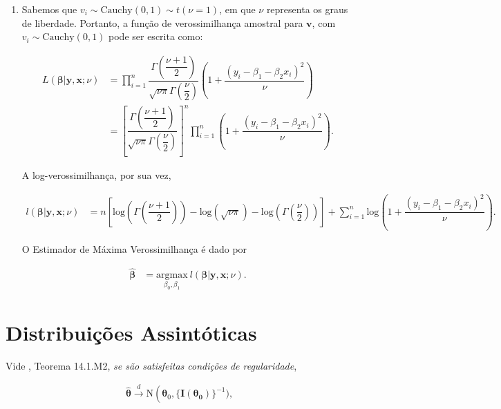 \documentclass{homework}\usepackage[]{graphicx}\usepackage[]{color}
\begin{document}
\begin{enumerate}
  \item Sabemos que $v_i \sim \mathrm{Cauchy}(0,1) \sim t(\nu = 1)$, em que $\nu$ representa os graus de liberdade. Portanto, a função de verossimilhança amostral para $\mathbf{v}$, com $v_i \sim \mathrm{Cauchy}(0,1)$ pode ser escrita como:
  
  \begin{align}
    L(\bm{\beta}|\mathbf{y}, \mathbf{x}; \nu) &= \prod_{i=1}^n\dfrac{\Gamma\left(\dfrac{\nu+1}{2}\right)}{\sqrt{\nu\pi}\Gamma\left(\dfrac{\nu}{2}\right)}\left(1 + \dfrac{\left(y_i - \beta_1 - \beta_2 x_i\right)^2}{\nu}\right)\nonumber\\
    &= \left[\dfrac{\Gamma\left(\dfrac{\nu+1}{2}\right)}{\sqrt{\nu\pi}\Gamma\left(\dfrac{\nu}{2}\right)}\right]^n\prod_{i=1}^n\left(1 + \dfrac{\left(y_i - \beta_1 - \beta_2 x_i\right)^2}{\nu}\right).
  \end{align}
  
  A log-verossimilhança, por sua vez,
  
  \begin{align}
    l(\bm{\beta}|\mathbf{y}, \mathbf{x}; \nu) &= n\left[\mathrm{log}\left(\Gamma\left(\dfrac{\nu+1}{2}\right)\right)-
    \mathrm{log}\left(\sqrt{\nu\pi}\right)-
    \mathrm{log}\left(\Gamma\left(\dfrac{\nu}{2}\right)\right)\right] + \sum_{i=1}^n\mathrm{log}\left(1 + \dfrac{\left(y_i - \beta_1 - \beta_2 x_i\right)^2}{\nu}\right).
  \end{align}
  
  O Estimador de Máxima Verossimilhança é dado por
  
  \begin{align}
    \hat{\bm{\beta}} &= \underset{\beta_0, \beta_1}{\mathrm{argmax}}\ l(\bm{\beta}|\mathbf{y}, \mathbf{x}; \nu).
  \end{align}

\end{enumerate}

\section{Distribuições Assintóticas}

Vide \cite{greene2011econometric}, Teorema 14.1.M2, \textit{se são satisfeitas condições de regularidade},

\begin{align}
  \hat{\bm{\theta}} \xrightarrow{d} \mathrm{N}\left(\bm{\theta}_0, \{\mathbf{I(\bm{\theta}_0)}\}^{-1}),
\end{align}
\end{document}
